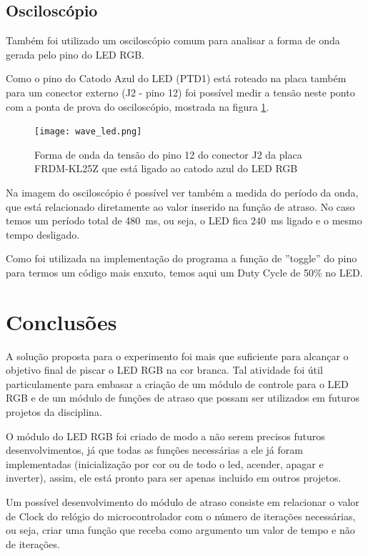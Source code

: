 \documentclass{article}
\begin{document}
\subsection{Osciloscópio}

Também foi utilizado um osciloscópio comum para analisar a forma de onda gerada pelo pino do LED RGB.

Como o pino do Catodo Azul do LED (PTD1) está roteado na placa também para um conector externo (J2 - pino 12) foi possível medir a tensão neste ponto com a ponta de prova do osciloscópio, mostrada na figura \ref{wave_led}.

\begin{figure}[ht!]
  \centering
  \texttt{[image: wave\_led.png]}
  \caption{Forma de onda da tensão do pino 12 do conector J2 da placa FRDM-KL25Z que está ligado ao catodo azul do LED RGB \label{wave_led}}
\end{figure}

Na imagem do osciloscópio é possível ver também a medida do período da onda, que está relacionado diretamente ao valor inserido na função de atraso. No caso temos um período total de \SI{480}{\milli\second}, ou seja, o LED fica \SI{240}{\milli\second} ligado e o mesmo tempo desligado.

Como foi utilizada na implementação do programa a função de ''toggle'' do pino para termos um código mais enxuto, temos aqui um Duty Cycle de 50\% no LED.

\section{Conclusões}

A solução proposta para o experimento foi mais que suficiente para alcançar o objetivo final de piscar o LED RGB na cor branca. Tal atividade foi útil particulamente para embasar a criação de um módulo de controle para o LED RGB e de um módulo de funções de atraso que possam ser utilizados em futuros projetos da disciplina.

O módulo do LED RGB foi criado de modo a não serem precisos futuros desenvolvimentos, já que todas as funções necessárias a ele já foram implementadas (inicialização por cor ou de todo o led, acender, apagar e inverter), assim, ele está pronto para ser apenas incluido em outros projetos.

Um possível desenvolvimento do módulo de atraso consiste em relacionar o valor de Clock do relógio do microcontrolador com o número de iterações necessárias, ou seja, criar uma função que receba como argumento um valor de tempo e não de iterações.
\end{document}
